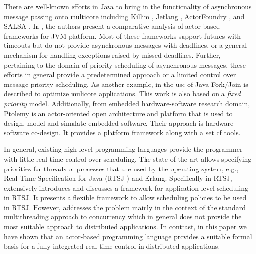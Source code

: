 There are well-known efforts in Java to bring in the
functionality of asynchronous message passing onto multicore including Killim
\cite{kilim:Srinivasan:Mycroft}, Jetlang \cite{jetlang}, ActorFoundry
\cite{actor_frameworks_jvm:agha}, and SALSA \cite{salsa:agha}. In
\cite{actor_frameworks_jvm:agha}, the authors present a comparative analysis of
actor-based frameworks for JVM platform. 
Most of these frameworks support futures with timeouts but do not provide asynchronous messages with deadlines, or
a general mechanism for handling exceptions raised by missed deadlines.
Further, pertaining to the domain of
priority scheduling of asynchronous messages, these efforts in general  provide a predetermined
approach or a limited control over message priority scheduling.
As another example, in  \cite{maia_rtsj_11} the use of Java Fork/Join is described  to optimize  mulicore applications.  This work is also based on a \textit{fixed priority} model. 
Additionally, from embedded hardware-software research domain, Ptolemy \cite{ptolemy:lee,actor:lee} is an actor-oriented open architecture and platform that is used to design, model and simulate embedded software. Their approach is hardware software co-design. It provides a platform framework along with a set of tools.

In general, existing high-level programming languages provide the programmer with little real-time control over
scheduling. The state of the art allows specifying priorities for threads or
processes that are  used by the operating system, e.g.,
Real-Time Specification for Java (RTSJ \cite{jsr1,jsr282}) and Erlang. 
Specifically in RTSJ, \cite{zerzel_rtsj} extensively introduces and discusses a framework
for application-level scheduling in RTSJ. It presents a flexible framework to allow scheduling
policies to be used in RTSJ. 
However, \cite{zerzel_rtsj}  addresses the problem mainly in the context of  the standard  multithreading approach to concurrency which in general does not provide
the most suitable approach to distributed applications.
In contrast,  in this paper
we have shown that an actor-based  programming
language provides a suitable formal basis for a fully integrated real-time control
in distributed applications.


